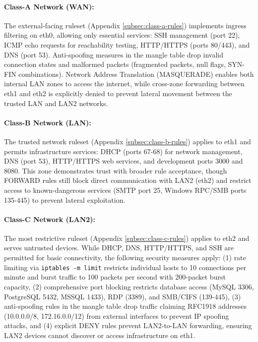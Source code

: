 \paragraph{Class-A Network (WAN):} The external-facing ruleset (Appendix \ref{subsec:class-a-rules}) implements ingress filtering on eth0, allowing only essential services: SSH management (port 22), ICMP echo requests for reachability testing, HTTP/HTTPS (ports 80/443), and DNS (port 53). Anti-spoofing measures in the mangle table drop invalid connection states and malformed packets (fragmented packets, null flags, SYN-FIN combinations). Network Address Translation (MASQUERADE) enables both internal LAN zones to access the internet, while cross-zone forwarding between eth1 and eth2 is explicitly denied to prevent lateral movement between the trusted LAN and LAN2 networks.

\paragraph{Class-B Network (LAN):} The trusted network ruleset (Appendix \ref{subsec:class-b-rules}) applies to eth1 and permits infrastructure services: DHCP (ports 67-68) for network management, DNS (port 53), HTTP/HTTPS web services, and development ports 3000 and 8080. This zone demonstrates trust with broader rule acceptance, though FORWARD rules still block direct communication with LAN2 (eth2) and restrict access to known-dangerous services (SMTP port 25, Windows RPC/SMB ports 135-445) to prevent lateral exploitation.

\paragraph{Class-C Network (LAN2):} The most restrictive ruleset (Appendix \ref{subsec:class-c-rules}) applies to eth2 and serves untrusted devices. While DHCP, DNS, HTTP/HTTPS, and SSH are permitted for basic connectivity, the following security measures apply: (1) rate limiting via \texttt{iptables -m limit} restricts individual hosts to 10 connections per minute and burst traffic to 100 packets per second with 200-packet burst capacity, (2) comprehensive port blocking restricts database access (MySQL 3306, PostgreSQL 5432, MSSQL 1433), RDP (3389), and SMB/CIFS (139-445), (3) anti-spoofing rules in the mangle table drop traffic claiming RFC1918 addresses (10.0.0.0/8, 172.16.0.0/12) from external interfaces to prevent IP spoofing attacks, and (4) explicit DENY rules prevent LAN2-to-LAN forwarding, ensuring LAN2 devices cannot discover or access infrastructure on eth1.

